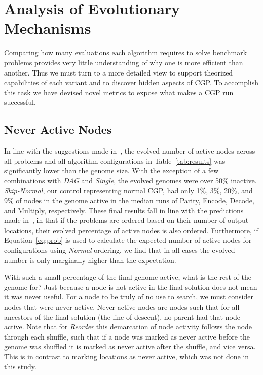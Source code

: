 \documentclass[journal]{IEEEtran}
\begin{document}

\section{Analysis of Evolutionary Mechanisms}
\label{sec:analysis}
Comparing how many evaluations each algorithm requires to solve benchmark
problems provides very little understanding of why one is more efficient than another.
Thus we must turn to a more detailed view
to support theorized capabilities of each variant and
to discover hidden aspects of CGP.
To accomplish this task we have devised novel metrics to expose what makes a
CGP run successful.

\subsection{Never Active Nodes}
In line with the suggestions made in~\cite{miller:2006:redundancy}, the evolved
number of active nodes across all problems and all algorithm configurations
in Table~\ref{tab:results}
was significantly lower than the genome size.  With the exception of a few combinations
with \emph{DAG} and \emph{Single}, the evolved genomes were over 50\% inactive.
\emph{Skip-Normal}, our control representing normal CGP, had only 1\%, 3\%, 20\%,
and 9\% of nodes in the genome active in the median runs of Parity, Encode, Decode,
and Multiply, respectively.  These final results fall in line with the predictions
made in~\cite{goldman:2013:ordering}, in that if the problems are ordered based on
their number of output locations, their evolved percentage of active nodes is also ordered.
Furthermore, if Equation~\ref{eq:prob} is used to calculate the expected number of
active nodes for configurations using \emph{Normal} ordering, we find that in all
cases the evolved number is only marginally higher than the expectation.

With such a small percentage of the final genome active, what is the rest of the
genome for?
Just because a node is not active in the final solution does not mean it was never
useful.  For a node to be truly of no use to search, we must consider nodes that
were never active.  Never active nodes are nodes such that for all ancestors of the
final solution (the line of descent), no parent had that node active.  Note that
for \emph{Reorder} this demarcation of node activity follows the node through
each shuffle, such that if a node was marked as never active before the genome
was shuffled it is marked as never active after the shuffle, and vice versa.
This is in contrast to marking locations as never active, which was not done in
this study.
\end{document}
